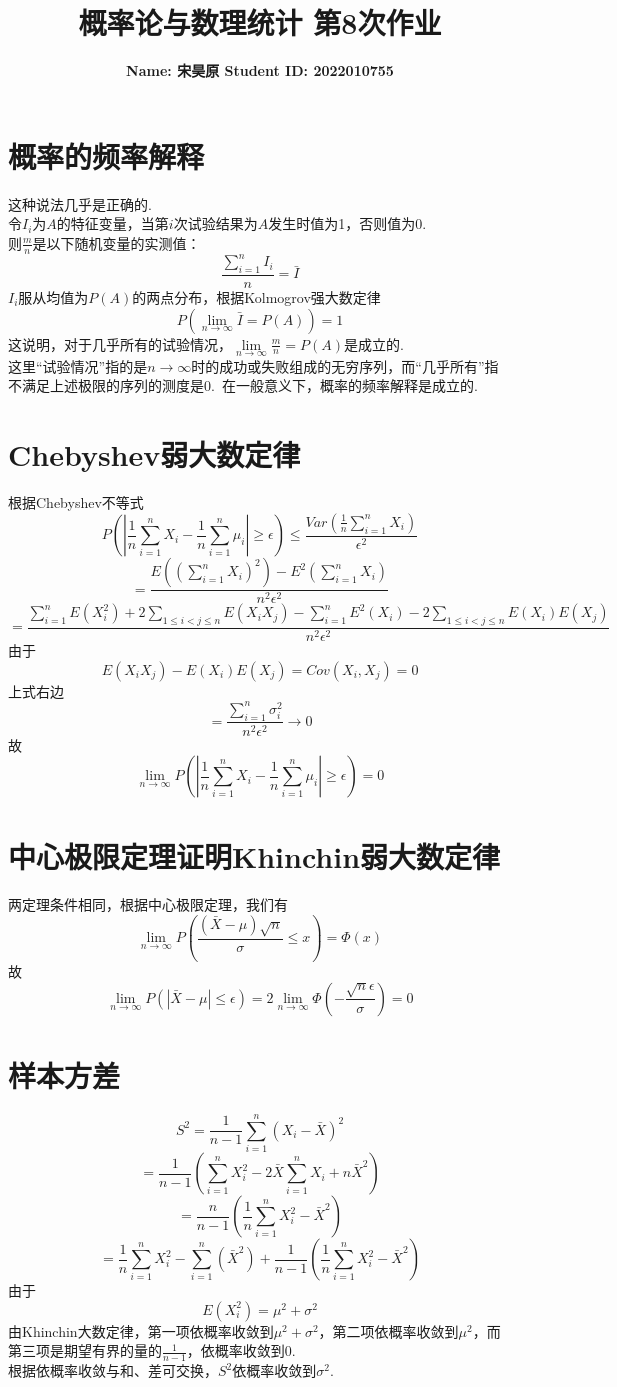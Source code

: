 \documentclass{article}
\title{\bf\Large  概率论与数理统计 第8次作业}
\author{\bf Name: 宋昊原 \qquad Student ID: 2022010755}
\begin{document}
\begin{CJK}{UTF8}{gbsn}
\maketitle
\section{概率的频率解释}
这种说法几乎是正确的.
\\令$I_{i}$为$A$的特征变量，当第$i$次试验结果为$A$发生时值为1，否则值为0.
\\则$\frac{m}{n}$是以下随机变量的实测值：
$$\frac{\sum\limits_{i=1}^{n}I_{i}}{n}=\bar{I}$$
$I_{i}$服从均值为$P(A)$的两点分布，根据Kolmogrov强大数定律
$$P(\lim\limits_{n\to\infty}\bar{I}=P(A))=1$$
这说明，对于几乎所有的试验情况，$\lim\limits_{n\to\infty}\frac{m}{n}=P(A)$是成立的.
\\这里“试验情况”指的是$n\to\infty$时的成功或失败组成的无穷序列，而“几乎所有”指不满足上述极限的序列的测度是0.\ 在一般意义下，概率的频率解释是成立的.
\section{Chebyshev弱大数定律}
根据Chebyshev不等式
$$ P(|\frac{1}{n}\sum\limits_{i=1}^{n}X_{i}-\frac{1}{n}\sum\limits_{i=1}^{n}\mu_{i}|\geq\epsilon)\leq\frac{Var(\frac{1}{n}\sum\limits_{i=1}^{n}X_{i})}{\epsilon^{2}}$$
$$ =\frac{E((\sum\limits_{i=1}^{n}X_{i})^{2})-E^{2}(\sum\limits_{i=1}^{n}X_{i})}{n^{2}\epsilon^{2}}$$
$$ =\frac{\sum\limits_{i=1}^{n}E(X_{i}^{2})+2\sum\limits_{1\leq i<j\leq n}E(X_{i}X_{j})-\sum\limits_{i=1}^{n}E^{2}(X_{i})-2\sum\limits_{1\leq i<j\leq n}E(X_{i})E(X_{j})}{n^{2}\epsilon^{2}}$$
由于
$$ E(X_{i}X_{j})-E(X_{i})E(X_{j})=Cov(X_{i},X_{j})=0$$
上式右边
$$ =\frac{\sum\limits_{i=1}^{n}\sigma_{i}^{2}}{n^{2}\epsilon^{2}}\to 0$$
故
$$ \lim\limits_{n\to\infty} P(|\frac{1}{n}\sum\limits_{i=1}^{n}X_{i}-\frac{1}{n}\sum\limits_{i=1}^{n}\mu_{i}|\geq\epsilon)=0$$
\section{中心极限定理证明Khinchin弱大数定律}
两定理条件相同，根据中心极限定理，我们有
$$ \lim\limits_{n\to\infty}P(\frac{(\bar{X}-\mu)\sqrt{n}}{\sigma}\leq x)=\Phi(x)$$
故
$$ \lim\limits_{n\to\infty}P(|\bar{X}-\mu|\leq\epsilon)=2\lim\limits_{n\to\infty}\Phi(-\frac{\sqrt{n}\epsilon}{\sigma})=0$$
\section{样本方差}
$$ S^{2}=\frac{1}{n-1}\sum\limits_{i=1}^{n}(X_{i}-\bar{X})^{2}$$
$$ =\frac{1}{n-1}(\sum\limits_{i=1}^{n}X_{i}^{2}-2\bar{X}\sum\limits_{i=1}^{n}X_{i}+n\bar{X}^{2})$$
$$ =\frac{n}{n-1}(\frac{1}{n}\sum\limits_{i=1}^{n}X_{i}^{2}-\bar{X}^{2})$$
$$ =\frac{1}{n}\sum\limits_{i=1}^{n}X_{i}^{2}-\sum\limits_{i=1}^{n}(\bar{X}^{2})+\frac{1}{n-1}(\frac{1}{n}\sum\limits_{i=1}^{n}X_{i}^{2}-\bar{X}^{2})$$
由于
$$ E(X_{i}^{2})=\mu^{2}+\sigma^{2}$$
由Khinchin大数定律，第一项依概率收敛到$\mu^{2}+\sigma^{2}$，第二项依概率收敛到$\mu^{2}$，而第三项是期望有界的量的$\frac{1}{n-1}$，依概率收敛到0.
\\根据依概率收敛与和、差可交换，$S^{2}$依概率收敛到$\sigma^{2}$.

\end{CJK}
\end{document}
